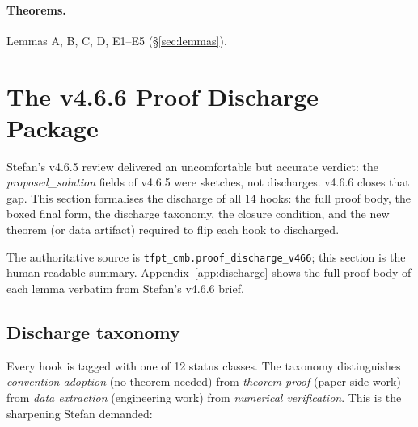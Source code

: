 \documentclass[11pt,a4paper]{article}
\begin{document}
\paragraph{Theorems.}
Lemmas A, B, C, D, E1--E5 (\S\ref{sec:lemmas}).

\section{The v4.6.6 Proof Discharge Package}
\label{sec:discharge}

Stefan's v4.6.5 review delivered an uncomfortable but accurate verdict:
the \emph{proposed\_solution} fields of v4.6.5 were sketches, not
discharges.  v4.6.6 closes that gap.  This section formalises the
discharge of all 14 hooks: the full proof body, the boxed final form,
the discharge taxonomy, the closure condition, and the new theorem (or
data artifact) required to flip each hook to \textsf{discharged}.

The authoritative source is
\texttt{tfpt\_cmb.proof\_discharge\_v466}; this section is the
human-readable summary.  Appendix~\ref{app:discharge} shows the full
proof body of each lemma verbatim from Stefan's v4.6.6 brief.

\subsection{Discharge taxonomy}

Every hook is tagged with one of 12 status classes.  The taxonomy
distinguishes \emph{convention adoption} (no theorem needed) from
\emph{theorem proof} (paper-side work) from \emph{data extraction}
(engineering work) from \emph{numerical verification}.  This is the
sharpening Stefan demanded:
\end{document}
